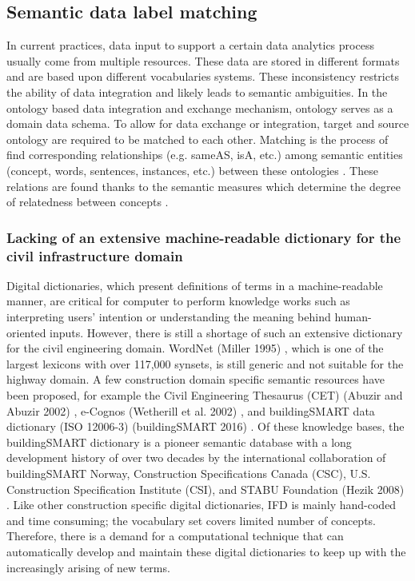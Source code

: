 \documentclass[Journal, InsideFigs, DoubleSpace]{ascelike} %
\begin{document}
\subsection{Semantic data label matching}
In current practices, data input to support a certain data analytics process usually come from multiple resources. These data are stored in different formats and are based upon different vocabularies systems. These inconsistency restricts the ability of data integration and likely leads to semantic ambiguities. In the ontology based data integration and exchange mechanism, ontology serves as a domain data schema. To allow for data exchange or integration, target and source ontology are required to  be matched to each other. Matching is the process of find corresponding relationships (e.g. sameAS, isA, etc.) among semantic entities (concept, words, sentences, instances, etc.) between these ontologies \cite{harispe15}. These relations are found thanks to the semantic measures which determine the degree of relatedness between concepts \cite{harispe15}. 

\subsubsection{Lacking of an extensive machine-readable dictionary for the civil infrastructure domain}
Digital dictionaries, which present definitions of terms in a machine-readable manner, are critical for computer to perform knowledge works such as interpreting users’ intention or understanding the meaning behind human-oriented inputs. However, there is still a shortage of such an extensive dictionary for the civil engineering domain. WordNet (Miller 1995) \cite{miller95}, which is one of the largest lexicons with over 117,000 synsets, is still generic and not suitable for the highway domain. A few construction domain specific semantic resources have been proposed, for example the Civil Engineering Thesaurus (CET) (Abuzir and Abuzir 2002) \cite{abuzir02}, e-Cognos (Wetherill et al. 2002) \cite{wetherill02}, and buildingSMART data dictionary (ISO 12006-3) (buildingSMART 2016)\cite{buildingsmartData} . Of these knowledge bases, the buildingSMART dictionary is a pioneer semantic database with a long development history of over two decades by the international collaboration of buildingSMART Norway, Construction Specifications Canada (CSC), U.S. Construction Specification Institute (CSI), and STABU Foundation (Hezik 2008) \cite{hezik08}. Like other construction specific digital dictionaries, IFD is mainly hand-coded and time consuming; the vocabulary set covers limited number of concepts. Therefore, there is a demand for a computational technique that can automatically develop and maintain these digital dictionaries to keep up with the increasingly arising of new terms. 
%
\end{document}
